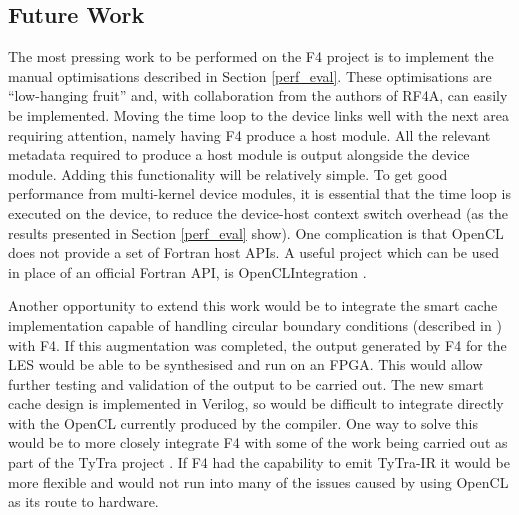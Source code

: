 \documentclass{mpaper}
\begin{document}
\subsection{Future Work}

The most pressing work to be performed on the F4 project is to implement the manual optimisations described in Section \ref{perf_eval}.
These optimisations are ``low-hanging fruit'' and, with collaboration from the authors of RF4A, can easily be implemented. 
Moving the time loop to the device links well with the next area requiring attention, namely having F4 produce a host module.
All the relevant metadata required to produce a host module is output alongside the device module.
Adding this functionality will be relatively simple. 
To get good performance from multi-kernel device modules, it is essential that the time loop is executed on the device, to reduce the device-host context switch overhead (as the results presented in Section \ref{perf_eval} show).
One complication is that OpenCL does not provide a set of Fortran host APIs.
A useful project which can be used in place of an official Fortran API, is OpenCLIntegration \cite{Vanderbauwhede2012}.

Another opportunity to extend this work would be to integrate the smart cache implementation capable of handling circular boundary conditions (described in \cite{Nabi2019}) with F4.
If this augmentation was completed, the output generated by F4 for the LES would be able to be synthesised and run on an FPGA.
This would allow further testing and validation of the output to be carried out.
The new smart cache design is implemented in Verilog, so would be difficult to integrate directly with the OpenCL currently produced by the compiler.
One way to solve this would be to more closely integrate F4 with some of the work being carried out as part of the TyTra project \cite{Nabi2015}.
If F4 had the capability to emit TyTra-IR it would be more flexible and would not run into many of the issues caused by using OpenCL as its route to hardware.



\end{document}
